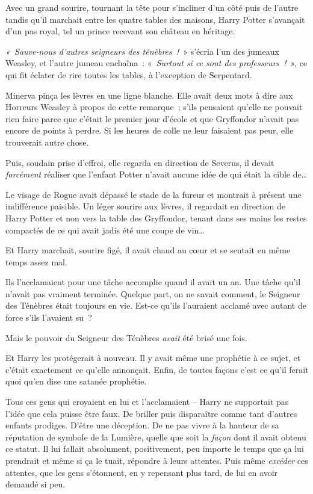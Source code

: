 Avec un grand sourire, tournant la tête pour s'incliner d'un côté puis de l'autre tandis qu'il marchait entre les quatre tables des maisons, Harry Potter s'avançait d'un pas royal, tel un prince recevant son château en héritage.

\emph{«~Sauve-nous d'autres seigneurs des ténèbres~!}~» s'écria l'un des jumeaux Weasley, et l'autre jumeau enchaîna~: «~\emph{Surtout si ce sont des professeurs~!}~», ce qui fit éclater de rire toutes les tables, à l'exception de Serpentard.

Minerva pinça les lèvres en une ligne blanche.
Elle avait deux mots à dire aux Horreurs Weasley à propos de cette remarque~;
s'ils pensaient qu'elle ne pouvait rien faire parce que c'était le premier jour d'école et que Gryffondor n'avait pas encore de points à perdre.
Si les heures de colle ne leur faisaient pas peur, elle trouverait autre chose.

Puis, soudain prise d'effroi, elle regarda en direction de Severus, il devait \emph{forcément} réaliser que l'enfant Potter n'avait aucune idée de qui était la cible de…

Le visage de Rogue avait dépassé le stade de la fureur et montrait à présent une indifférence paisible.
Un léger sourire aux lèvres, il regardait en direction de Harry Potter et non vers la table des Gryffondor, tenant dans ses mains les restes compactés de ce qui avait jadis été une coupe de vin…

\later

Et Harry marchait, sourire figé, il avait chaud au cœur et se sentait en même temps assez mal.

Ils l'acclamaient pour une tâche accomplie quand il avait un an.
Une tâche qu'il n'avait pas vraiment terminée.
Quelque part, on ne savait comment, le Seigneur des Ténèbres était toujours en vie.
Est-ce qu'ils l'auraient acclamé avec autant de force s'ils l'avaient su~?

Mais le pouvoir du Seigneur des Ténèbres \emph{avait} été brisé une fois.

Et Harry les protégerait à nouveau.
Il y avait même une prophétie à ce sujet, et c'était exactement ce qu'elle annonçait.
Enfin, de toutes façons c'est ce qu'il ferait quoi qu'en dise une satanée prophétie.

Tous ces gens qui croyaient en lui et l'acclamaient -- Harry ne supportait pas l'idée que cela puisse être faux.
De briller puis disparaître comme tant d'autres enfants prodiges.
D'être une déception.
De ne pas vivre à la hauteur de sa réputation de symbole de la Lumière, quelle que soit la \emph{façon} dont il avait obtenu ce statut.
Il lui fallait absolument, positivement, peu importe le temps que ça lui prendrait et même si ça le tuait, répondre à leurs attentes.
Puis même \emph{excéder} ces attentes, que les gens s'étonnent, en y repensant plus tard, de lui en avoir demandé si peu.

